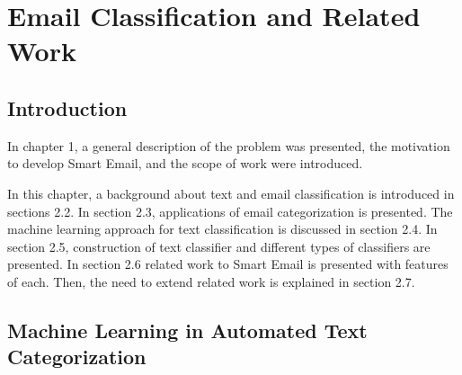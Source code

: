 \newenvironment{my_itemize}
{\begin{itemize}
  \setlength{\itemsep}{0cm}
  \setlength{\parskip}{0cm}}
{\end{itemize}}
\newenvironment{my_enumerate}
{\begin{enumerate}
  \setlength{\itemsep}{0cm}
  \setlength{\parskip}{0cm}}
{\end{enumerate}}

\chapter{Email Classification and Related Work} %

\label{Chapter2} %



\section{Introduction}
In chapter 1, a general description of the problem was presented, the motivation to develop Smart Email, and the scope of work were introduced.

In this chapter, a background about text and email classification is introduced in
sections 2.2. In section 2.3, applications of email categorization is presented. The machine learning approach for text classification is discussed in section 2.4. In section 2.5, construction of text classifier and different types of classifiers are presented. In section 2.6 related work to Smart Email is presented with features of each. Then, the need to
extend related work is explained in section 2.7.


\section{Machine Learning in Automated Text Categorization}

